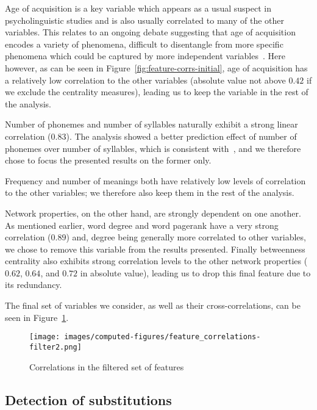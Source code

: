 Age of acquisition is a key variable which appears as a usual suspect in psycholinguistic studies and is also usually correlated to many of the other variables.
This relates to an ongoing debate suggesting that age of acquisition encodes a variety of phenomena, difficult to disentangle from more specific phenomena which could be captured by more independent variables~\CN{}.
Here however, as can be seen in Figure~\ref{fig:feature-corrs-initial}, age of acquisition has a relatively low correlation to the other variables (absolute value not above $0.42$ if we exclude the centrality measures), leading us to keep the variable in the rest of the analysis.

Number of phonemes and number of syllables naturally exhibit a strong linear correlation ($0.83$).
The analysis showed a better prediction effect of number of phonemes over number of syllables, which is consistent with~\citet{nick-diss}, and we therefore chose to focus the presented results on the former only.

Frequency and number of meanings both have relatively low levels of correlation to the other variables; we therefore also keep them in the rest of the analysis.

\bigskip
Network properties, on the other hand, are strongly dependent on one another.
As mentioned earlier, word degree and word pagerank have a very strong correlation ($0.89$) and, degree being generally more correlated to other variables, we chose to remove this variable from the results presented.
Finally betweenness centrality also exhibits strong correlation levels to the other network properties ($0.62$, $0.64$, and $0.72$ in absolute value), leading us to drop this final feature due to its redundancy.

The final set of variables we consider, as well as their cross-correlations, can be seen in Figure~\ref{fig:feature-corrs-filtered}.

\begin{figure}[!th]
    \centering
    \texttt{[image: images/computed-figures/feature\_correlations-filter2.png]}
    \caption{Correlations in the filtered set of features }
    \label{fig:feature-corrs-filtered}
\end{figure}


\subsection{Detection of substitutions}

